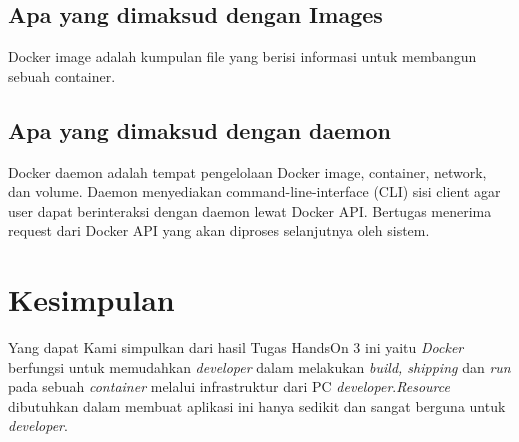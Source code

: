 \documentclass[11pt,a4paper]{article}
\begin{document}
\subsection{Apa yang dimaksud dengan Images}
Docker image adalah kumpulan file yang berisi informasi untuk membangun sebuah container.

\subsection{Apa yang dimaksud dengan daemon}
Docker daemon adalah tempat pengelolaan Docker image, container, network, dan volume. Daemon menyediakan command-line-interface (CLI) sisi client agar user dapat berinteraksi dengan daemon lewat Docker API. Bertugas menerima request dari Docker API yang akan diproses selanjutnya oleh sistem.

\section{Kesimpulan}
Yang dapat Kami simpulkan dari hasil Tugas HandsOn 3 ini yaitu \textit{Docker} berfungsi untuk memudahkan \textit{developer} dalam melakukan \textit{build, shipping} dan \textit{run} pada sebuah \textit{container} melalui infrastruktur dari PC \textit{developer}.\textit{Resource} dibutuhkan dalam membuat aplikasi ini hanya sedikit dan sangat berguna untuk \textit{developer}.
\newpage


\end{document}
